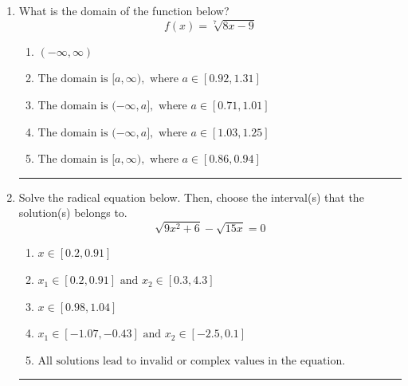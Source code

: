 \documentclass[14pt]{extbook}
\newcommand{\litem}[1]{\item#1\hspace*{-1cm}\rule{\textwidth}{0.4pt}}
\begin{document}
\begin{enumerate}
{\begin{enumerate}[label=\Alph*.]
\end{enumerate} }
\litem{
What is the domain of the function below?\[ f(x) = \sqrt[7]{8 x - 9} \]\begin{enumerate}[label=\Alph*.]
\item \( (-\infty, \infty) \)
\item \( \text{The domain is } [a, \infty), \text{   where } a \in [0.92, 1.31] \)
\item \( \text{The domain is } (-\infty, a], \text{   where } a \in [0.71, 1.01] \)
\item \( \text{The domain is } (-\infty, a], \text{   where } a \in [1.03, 1.25] \)
\item \( \text{The domain is } [a, \infty), \text{   where } a \in [0.86, 0.94] \)

\end{enumerate} }
\litem{
Solve the radical equation below. Then, choose the interval(s) that the solution(s) belongs to.\[ \sqrt{9 x^2 + 6} - \sqrt{15 x} = 0 \]\begin{enumerate}[label=\Alph*.]
\item \( x \in [0.2,0.91] \)
\item \( x_1 \in [0.2, 0.91] \text{ and } x_2 \in [0.3,4.3] \)
\item \( x \in [0.98,1.04] \)
\item \( x_1 \in [-1.07, -0.43] \text{ and } x_2 \in [-2.5,0.1] \)
\item \( \text{All solutions lead to invalid or complex values in the equation.} \)


\end{enumerate}}
\end{enumerate}
\end{document}
